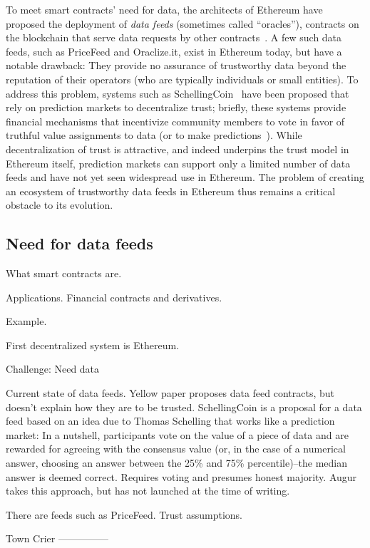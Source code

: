 To meet smart contracts' need for data, the architects of Ethereum have proposed the deployment of \emph{data feeds} (sometimes called ``oracles''), contracts on the blockchain that serve data requests by other contracts~\cite{whitepaper,yellowpaper}. A few such data feeds, such as PriceFeed and Oraclize.it, exist in Ethereum today, but have a notable drawback: They provide no assurance of trustworthy data beyond the reputation of their operators (who are typically individuals or small entities). To address this problem, systems such as SchellingCoin~\cite{} have been proposed that rely on prediction markets to decentralize trust; briefly, these systems provide financial mechanisms that incentivize community members to vote in favor of truthful value assignments to data (or to make predictions~\cite{Augur}). While decentralization of trust is attractive, and indeed underpins the trust model in Ethereum itself, prediction markets can support only a limited number of data feeds and have not yet seen widespread use in Ethereum. The problem of creating an ecosystem of trustworthy data feeds in Ethereum thus remains a critical obstacle to its evolution. 


\subsection{Need for data feeds}



What smart contracts are.

Applications. Financial contracts and derivatives.

Example.

First decentralized system is Ethereum.

Challenge: Need data


Current state of data feeds. Yellow paper proposes data feed contracts, but doesn't explain how they are to be trusted. SchellingCoin is a proposal for a data feed based on an idea due to Thomas Schelling that works like a prediction market: In a nutshell, participants vote on the value of a piece of data and are rewarded for agreeing with the consensus value (or, in the case of a numerical answer, choosing an answer between the 25\% and 75\% percentile)--the median answer is deemed correct. Requires voting and presumes honest majority. Augur takes this approach, but has not launched at the time of writing.

There are feeds such as PriceFeed. Trust assumptions.

Town Crier
---------------

